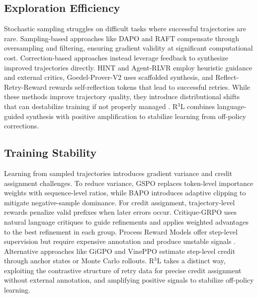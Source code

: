 \documentclass{article} %
\theoremstyle{definition}
\theoremstyle{remark}
\let\cite\citep
\begin{document}
\subsection{Exploration Efficiency}
Stochastic sampling struggles on difficult tasks where successful trajectories are rare. Sampling-based approaches like DAPO \cite{yu2025dapo} and RAFT \cite{dongraft} compensate through oversampling and filtering, ensuring gradient validity at significant computational cost. Correction-based approaches instead leverage feedback to synthesize improved trajectories directly. HINT \cite{wang2025hint} and Agent-RLVR \cite{da2025agent} employ heuristic guidance and external critics, Goedel-Prover-V2 \cite{lin2025goedel} uses scaffolded synthesis, and Reflect-Retry-Reward \cite{bensal2025reflect} rewards self-reflection tokens that lead to successful retries. While these methods improve trajectory quality, they introduce distributional shifts that can destabilize training if not properly managed \cite{zheng2025prosperity}. R$^3$L combines language-guided synthesis with positive amplification to stabilize learning from off-policy corrections. 

\subsection{Training Stability}
Learning from sampled trajectories introduces gradient variance and credit assignment challenges. To reduce variance, GSPO \cite{zheng2025group} replaces token-level importance weights with sequence-level ratios, while BAPO \cite{xi2025bapo} introduces adaptive clipping to mitigate negative-sample dominance. For credit assignment, trajectory-level rewards penalize valid prefixes when later errors occur. Critique-GRPO \cite{zhang2025critique} uses natural language critiques to guide refinements and applies weighted advantages to the best refinement in each group. Process Reward Models \cite{wang2024math} offer step-level supervision but require expensive annotation and produce unstable signals \cite{xiong2024watch}. Alternative approaches like GiGPO \cite{feng2025group} and VinePPO \cite{kazemnejad2024vineppo} estimate step-level credit through anchor states or Monte Carlo rollouts. R$^3$L takes a distinct way, exploiting the contrastive structure of retry data for precise credit assignment without external annotation, and amplifying positive signals to stabilize off-policy learning.
\end{document}
